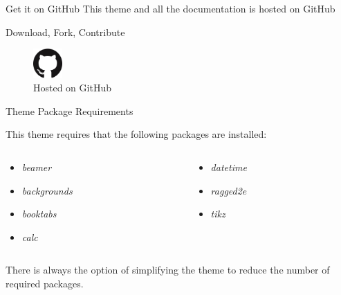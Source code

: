 \documentclass[newPxFont,numfooter,sectionpages]{beamer}
\begin{document}

\begin{frame}[c]{Get it on GitHub}
This theme and all the documentation is hosted on GitHub \\
\vspace{1em}
\begin{center}
\large{Download, Fork, Contribute}

\vspace{1em}

\begin{figure}
	\centerline{\includegraphics[width=0.1\textwidth]{GitHub-Mark-120px-plus.png}}
\caption{Hosted on GitHub}
\end{figure}

\end{center}
\end{frame}



\begin{frame}{Theme Package Requirements}

This theme requires that the following packages are installed:

\begin{columns}[t]
\begin{column}{0.5\textwidth}
\begin{itemize}
\item \emph{beamer}
\item \emph{backgrounds}
\item \emph{booktabs}
\item \emph{calc}
\end{itemize}
\end{column}

\begin{column}{0.5\textwidth}
\begin{itemize}
\item \emph{datetime}
\item \emph{ragged2e}
\item \emph{tikz}
\end{itemize}
\end{column}
\end{columns}
\vspace{1cm}
There is always the option of simplifying the theme to reduce the number of required packages. 

\end{frame}
\end{document}
